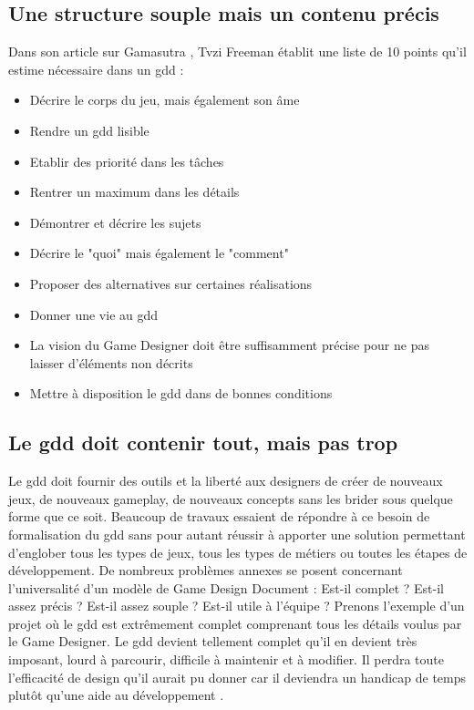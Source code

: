 \subsection{Une structure souple mais un contenu précis}
Dans son article sur Gamasutra \cite{gama_greateGDD}, Tvzi Freeman établit une liste de 10 points qu'il estime nécessaire dans un \gls{gdd} :
\begin{itemize}
    \item Décrire le corps du jeu, mais également son âme
    \item Rendre un \gls{gdd} lisible
    \item Etablir des priorité dans les tâches
    \item Rentrer un maximum dans les détails
    \item Démontrer et décrire les sujets
    \item Décrire le "quoi" mais également le "comment"
    \item Proposer des alternatives sur certaines réalisations
    \item Donner une vie au \gls{gdd}
    \item La vision du Game Designer doit être suffisamment précise pour ne pas laisser d'éléments non décrits
    \item Mettre à disposition le \gls{gdd} dans de bonnes conditions
\end{itemize}

\subsection{Le \gls{gdd} doit contenir tout, mais pas trop}
Le \gls{gdd} doit fournir des outils et la liberté aux designers de créer de nouveaux jeux, de nouveaux gameplay, de nouveaux concepts sans les brider sous quelque forme que ce soit. Beaucoup de travaux essaient de répondre à ce besoin de formalisation du \gls{gdd} \cite{GDD_software} \cite{multiview} \cite{GDD_GDProject} \cite{gama_greateGDD} sans pour autant réussir à apporter une solution permettant d'englober tous les types de jeux, tous les types de métiers ou toutes les étapes de développement. De nombreux problèmes annexes se posent concernant l'universalité d'un modèle de Game Design Document : Est-il complet ? Est-il assez précis ? Est-il assez souple ? Est-il utile à l'équipe ? Prenons l'exemple d'un projet où le \gls{gdd} est extrêmement complet comprenant tous les détails voulus par le Game Designer. Le \gls{gdd} devient tellement complet qu'il en devient très imposant, lourd à parcourir, difficile à maintenir et à modifier. Il perdra toute l'efficacité de design qu'il aurait pu donner car il deviendra un handicap de temps plutôt qu'une aide au développement \cite{onepage_librande}.

